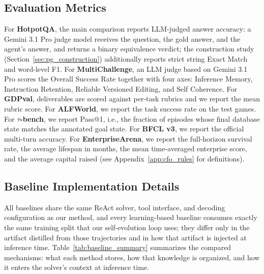 \subsection{Evaluation Metrics}
\label{app:metric_details}

For \textbf{HotpotQA}, the main comparison reports LLM-judged answer accuracy: a Gemini 3.1 Pro judge model receives the question, the gold answer, and the agent's answer, and returns a binary equivalence verdict; the construction study (Section~\ref{sec:pg_construction}) additionally reports strict string Exact Match and word-level F1. For \textbf{MultiChallenge}, an LLM judge based on Gemini 3.1 Pro scores the Overall Success Rate together with four axes: Inference Memory, Instruction Retention, Reliable Versioned Editing, and Self Coherence. For \textbf{GDPval}, deliverables are scored against per-task rubrics and we report the mean rubric score. For \textbf{ALFWorld}, we report the task success rate on the test games. For \textbf{$\tau$-bench}, we report Pass@1, i.e., the fraction of episodes whose final database state matches the annotated goal state. For \textbf{BFCL v3}, we report the official multi-turn accuracy. For \textbf{EnterpriseArena}, we report the full-horizon survival rate, the average lifespan in months, the mean time-averaged enterprise score, and the average capital raised (see Appendix~\ref{app:cfo_rules} for definitions).

\subsection{Baseline Implementation Details}
\label{app:baseline_details}

All baselines share the same ReAct solver, tool interface, and decoding configuration as our method, and every learning-based baseline consumes exactly the same training split that our self-evolution loop uses; they differ only in the artifact distilled from those trajectories and in how that artifact is injected at inference time. Table~\ref{tab:baseline_summary} summarizes the compared mechanisms: what each method stores, how that knowledge is organized, and how it enters the solver's context at inference time.

